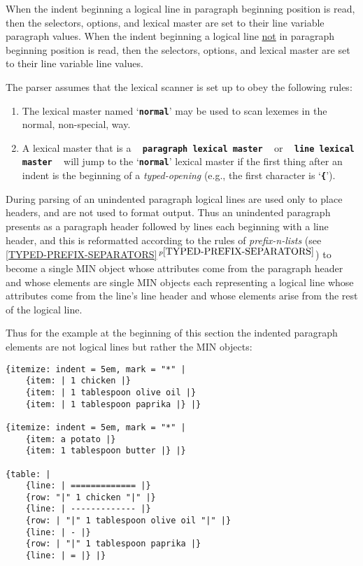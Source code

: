 \documentclass[12pt]{article}
\makeatletter
\newcommand{\TT}[1]{{\tt \bfseries #1}}
\newcommand{\ttmkey}[2]{\TT{#1}\index{#1@{\tt #1}!#2}}
\newcommand{\itemref}[1]{\ref{#1}$\,^{p\pageref{#1}}$}
\newenvironment{indpar}[1][0.3in]%
	{\begin{list}{}%
		     {\setlength{\itemsep}{0in}%
		      \setlength{\topsep}{0in}%
		      \setlength{\parsep}{1ex}%
		      \setlength{\labelwidth}{#1}%
		      \setlength{\leftmargin}{#1}%
		      \addtolength{\leftmargin}{\labelsep}}%
	 \item}%
	{\end{list}}
\makeatother
\begin{document}
When the indent beginning a logical line in paragraph beginning position
is read, then the selectors, options, and lexical master are set to
their line variable paragraph values.\label{SETTINGS-AFTER-INDENT}
When the indent beginning a logical line \underline{not}
in paragraph beginning position
is read, then the selectors, options, and lexical master are set to
their line variable line values.

The parser assumes that the lexical scanner is set up to obey
the following rules:
\begin{enumerate}
\item The lexical master named `\ttmkey{normal}{lexical master}'
may be used to scan lexemes in the normal, non-special, way.

\item A lexical master that is a ~ \TT{paragraph lexical master}
~ or ~ \TT{line lexical master} ~
will jump to the `\TT{normal}' lexical master if the first thing after
an indent is the beginning of a {\em typed-opening} (e.g., the
first character is `\TT{\{}').

\end{enumerate}

During parsing of an unindented paragraph logical lines are
used only to place headers, and are not used to format output.
Thus an unindented paragraph presents as a paragraph header
followed by lines each beginning with a line header, and
this is reformatted according to the rules of {\em prefix-n-lists}
(see \itemref{TYPED-PREFIX-SEPARATORS}) to become a single
MIN object whose attributes come from the paragraph header
and whose elements are single MIN objects each representing
a logical line whose attributes come from the line's line header
and whose elements arise from the rest of the logical line.

Thus for the example at the beginning of this section the
indented paragraph elements are not logical lines but rather
the MIN objects:
\begin{indpar}\begin{verbatim}
{itemize: indent = 5em, mark = "*" |
    {item: | 1 chicken |}
    {item: | 1 tablespoon olive oil |}
    {item: | 1 tablespoon paprika |} |}

{itemize: indent = 5em, mark = "*" |
    {item: a potato |}
    {item: 1 tablespoon butter |} |}

{table: |
    {line: | ============= |}
    {row: "|" 1 chicken "|" |}
    {line: | ------------- |}
    {row: | "|" 1 tablespoon olive oil "|" |}
    {line: | - |}
    {row: | "|" 1 tablespoon paprika |}
    {line: | = |} |}
\end{verbatim}\end{indpar}
\end{document}
